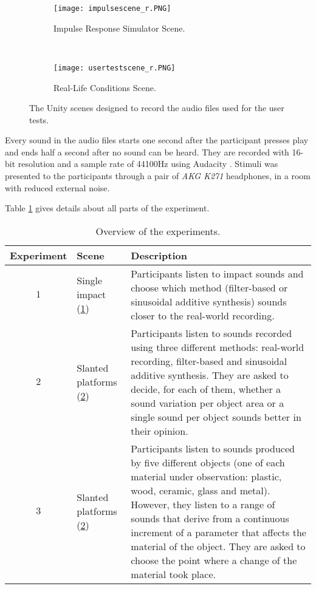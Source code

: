 \begin{figure}[H]
    \centering
    \begin{subfigure}[b]{0.48\textwidth}
        \texttt{[image: impulsescene\_r.PNG]}
        \caption{Impulse Response Simulator Scene.}
        \label{fig:test_sc1}
    \end{subfigure}
    ~ %
    \begin{subfigure}[b]{0.48\textwidth}
        \texttt{[image: usertestscene\_r.PNG]}
        \caption{Real-Life Conditions Scene.}
        \label{fig:test_sc2}
    \end{subfigure}
    \caption{The Unity\textsuperscript{\textregistered} scenes designed to record the audio files used for the user tests.}\label{fig:test_scenes}
\end{figure}

Every sound in the audio files starts one second after the participant presses play and ends half a second after no sound can be heard. They are recorded with 16-bit resolution and a sample rate of 44100Hz using Audacity\textsuperscript{\textregistered} \cite{bib:audacity}. Stimuli was presented to the participants through a pair of \textit{AKG K271} headphones, in a room with reduced external noise.

Table \ref{tab:test_dec} gives details about all parts of the experiment.

\begin{table}[H]
	\centering
    \begin{tabular}{ c  l  p{7cm}  }
    \toprule
    \textbf{Experiment} & \textbf{Scene} & \textbf{Description} \\ \toprule
    \addlinespace
    $1$ & Single impact (\ref{fig:test_sc1}) & Participants listen to impact sounds and choose which method (filter-based or sinusoidal additive synthesis) sounds closer to the real-world recording.  \\
    \addlinespace
    $2$ & Slanted platforms (\ref{fig:test_sc2}) & Participants listen to sounds recorded using three different methods: real-world recording, filter-based and sinusoidal additive synthesis. They are asked to decide, for each of them, whether a sound variation per object area or a single sound per object sounds better in their opinion.  \\
    \addlinespace
    $3$ & Slanted platforms (\ref{fig:test_sc2}) & Participants listen to sounds produced by five different objects (one of each material under observation: plastic, wood, ceramic, glass and metal). However, they listen to a range of sounds that derive from a continuous increment of a parameter that affects the material of the object. They are asked to choose the point where a change of the material took place. \\ 
    \bottomrule
    \end{tabular}
    \caption{Overview of the experiments.}
    \label{tab:test_dec}
\end{table} 

